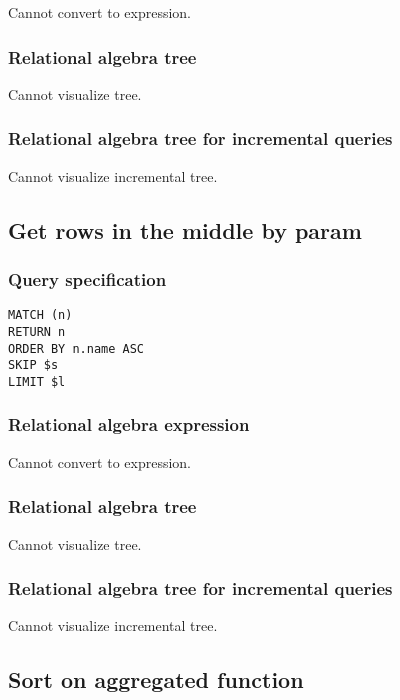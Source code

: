 Cannot convert to expression.

\subsubsection*{Relational algebra tree}

Cannot visualize tree.

\subsubsection*{Relational algebra tree for incremental queries}

Cannot visualize incremental tree.

\subsection{Get rows in the middle by param}

\subsubsection*{Query specification}

\begin{lstlisting}
MATCH (n)
RETURN n
ORDER BY n.name ASC
SKIP $s
LIMIT $l
\end{lstlisting}

\subsubsection*{Relational algebra expression}

Cannot convert to expression.

\subsubsection*{Relational algebra tree}

Cannot visualize tree.

\subsubsection*{Relational algebra tree for incremental queries}

Cannot visualize incremental tree.

\subsection{Sort on aggregated function}

